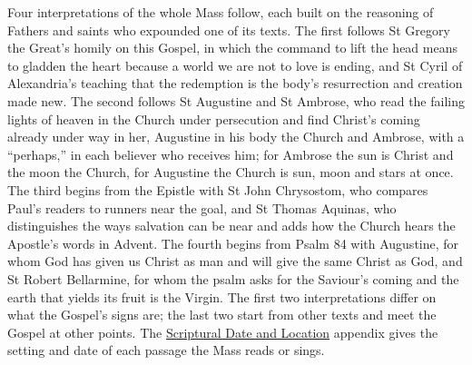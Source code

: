 Four interpretations of the whole Mass follow, each built on the reasoning of
Fathers and saints who expounded one of its texts. The first follows St
Gregory the Great's homily on this Gospel, in which the command to lift the
head means to gladden the heart because a world we are not to love is
ending, and St Cyril of Alexandria's teaching that the redemption is the
body's resurrection and creation made new. The second follows St Augustine
and St Ambrose, who read the failing lights of heaven in the Church under
persecution and find Christ's coming already under way in her, Augustine
in his body the Church and Ambrose, with a ``perhaps,'' in each believer who
receives him; for Ambrose the sun is Christ and the moon the Church, for
Augustine the Church is sun, moon and stars at once. The third begins from the
Epistle with St John Chrysostom, who compares Paul's readers to runners near
the goal, and St Thomas Aquinas, who distinguishes the ways
salvation can be near and adds how the Church hears the Apostle's words in
Advent. The fourth begins from Psalm 84 with Augustine, for whom God has given
us Christ as man and will give the same Christ as God, and St Robert
Bellarmine, for whom the psalm asks for the Saviour's coming and the earth
that yields its fruit is the Virgin. The first two interpretations differ on
what the Gospel's signs are; the last two start from other texts and meet the
Gospel at other points. The
\hyperref[sec:date-location]{Scriptural Date and Location} appendix gives the
setting and date of each passage the Mass reads or sings.

